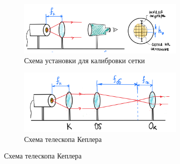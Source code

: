 \begin{figure}[h!]
    \centering
    \begin{subfigure}{0.45\linewidth}
        \centering
        \includegraphics[width=8cm]{images/setup4(1).png}
        \caption{Схема установки для калибровки сетки}
    \end{subfigure}
    \hfill
    \begin{subfigure}{0.45\linewidth}
        \centering
        \includegraphics[width=8cm]{images/setup4(2).png}
        \caption{Схема телескопа Кеплера}
    \end{subfigure}
\end{figure}

